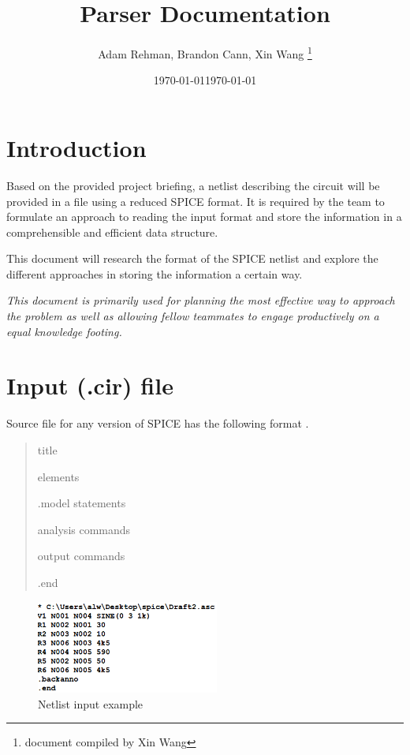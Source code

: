 \documentclass[a4paper, titlepage]{article}
\title{Parser Documentation}
\author{Adam Rehman, Brandon Cann, Xin Wang \thanks{document compiled by Xin Wang}}
\date \today
\date{\today}
\begin{document}
    \maketitle
    
    \tableofcontents
    \pagebreak
 
    \section{Introduction}
    \indent
    Based on the provided project briefing, a netlist describing the circuit will be provided in a file 
    using a reduced SPICE format. It is required by the team to formulate an approach to reading the input format and 
    store the information in a comprehensible and efficient data structure. 
    \par
    This document will research the format of the SPICE netlist and explore the different approaches in 
    storing the information a certain way. 
    \par
    \begin{center}
        \textit{This document is primarily used for planning the most effective 
        way to approach the problem as well as allowing fellow teammates to 
        engage productively on a equal knowledge footing.}
    \end{center}
    \section{Input (.cir) file}
    Source file for any version of SPICE has the following format \cite{spice}.
    \begin{quotation}
        {\selectfont
            title \par
            elements \par
            .model statements \par
            analysis commands \par
            output commands \par
            .end \par
        }
    \end{quotation}

    \begin{figure}[h]
        \centering
        \includegraphics[width=60mm,scale=1]{spice netlist example}
        \caption{Netlist input example}
        \label{fig:Netlist input example}
    \end{figure}
\end{document}
